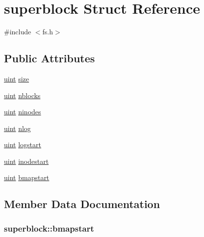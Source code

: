 \hypertarget{structsuperblock}{}\section{superblock Struct Reference}
\label{structsuperblock}


{\ttfamily \#include $<$fs.\+h$>$}

\subsection*{Public Attributes}
\begin{DoxyCompactItemize}
\item 
\hyperlink{types_8h_a91ad9478d81a7aaf2593e8d9c3d06a14}{uint} \hyperlink{structsuperblock_a7c6e4d6da139ecee74eb7816d5d44fa6}{size}
\item 
\hyperlink{types_8h_a91ad9478d81a7aaf2593e8d9c3d06a14}{uint} \hyperlink{structsuperblock_a2a27a7cfb54689f0e1dcd1788d049218}{nblocks}
\item 
\hyperlink{types_8h_a91ad9478d81a7aaf2593e8d9c3d06a14}{uint} \hyperlink{structsuperblock_a355d2a1ebdc51f80820c23e69363cf42}{ninodes}
\item 
\hyperlink{types_8h_a91ad9478d81a7aaf2593e8d9c3d06a14}{uint} \hyperlink{structsuperblock_aea92ae872785fd4fb39b903d9157aac5}{nlog}
\item 
\hyperlink{types_8h_a91ad9478d81a7aaf2593e8d9c3d06a14}{uint} \hyperlink{structsuperblock_a460268b28aced19797e8d7b84aa60ebf}{logstart}
\item 
\hyperlink{types_8h_a91ad9478d81a7aaf2593e8d9c3d06a14}{uint} \hyperlink{structsuperblock_adde361528f3905445974301b424611c1}{inodestart}
\item 
\hyperlink{types_8h_a91ad9478d81a7aaf2593e8d9c3d06a14}{uint} \hyperlink{structsuperblock_a3c815dda5be6bda609389e76434171cc}{bmapstart}
\end{DoxyCompactItemize}


\subsection{Member Data Documentation}
\subsubsection[{\texorpdfstring{bmapstart}{bmapstart}}]{ superblock\+::bmapstart}\hypertarget{structsuperblock_a3c815dda5be6bda609389e76434171cc}{}\label{structsuperblock_a3c815dda5be6bda609389e76434171cc}
